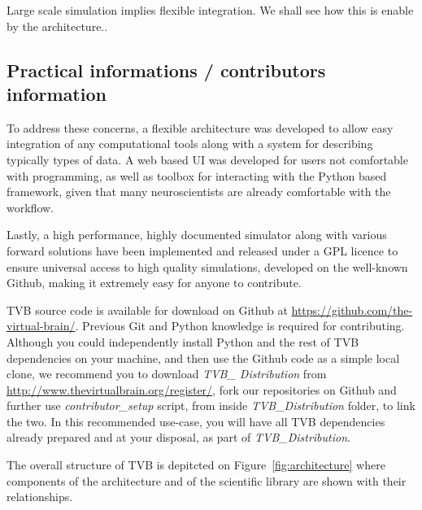 Large scale simulation implies flexible integration. We shall see
how this is enable by the architecture..

\subsection{Practical informations / contributors information}

To address these concerns, a flexible architecture was developed to
allow easy integration of any computational tools along with a system
for describing typically types of data. A web based UI was developed
for users not comfortable with programming, as well as \matlab{} toolbox
for interacting with the Python based framework, given that many
neuroscientists are already comfortable with the \matlab{} workflow.

Lastly, a high performance, highly documented simulator along with
various forward solutions have been implemented and released under a
GPL licence to ensure universal access to high quality simulations, 
developed on the well-known Github, making it extremely easy for 
anyone to contribute.

TVB source code is available for download on Github at
\url{https://github.com/the-virtual-brain/}.  Previous Git and Python knowledge
is required for contributing.  Although you could independently install Python
and the rest of TVB dependencies on your machine, and then use the Github code
as a simple local clone, we recommend you to download \emph{TVB\_ Distribution}
from \url{http://www.thevirtualbrain.org/register/}, fork our repositories on
Github and further use \emph{contributor\_setup} script, from inside \emph{TVB\_Distribution} 
folder, to link the two.  In this recommended use-case, you will
have all TVB dependencies already prepared and at your disposal, as part of
\emph{TVB\_Distribution}. 


The overall structure of TVB is depitcted on Figure~\ref{fig:architecture} where
components of the architecture and of the scientific library are shown with
their relationships.

